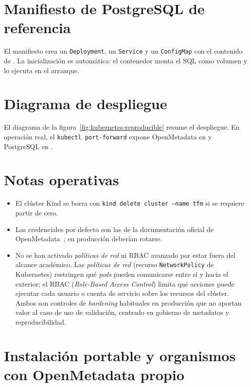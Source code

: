 \section{Manifiesto de PostgreSQL de referencia}

El manifiesto  crea un \texttt{Deployment}, un \texttt{Service} y un \texttt{ConfigMap} con el contenido de . La inicialización es automática: el contenedor monta el \ac{SQL} como volumen y lo ejecuta en el arranque.

\section{Diagrama de despliegue}

El diagrama de la figura~\ref{fig:kubernetes-reproducible} resume el despliegue. En operación real, el \texttt{kubectl port-forward} expone OpenMetadata en  y PostgreSQL en .

\section{Notas operativas}

\begin{itemize}
    \item El clúster Kind se borra con \texttt{kind delete cluster --name tfm} si se requiere partir de cero.
    \item Las credenciales por defecto son las de la documentación oficial de OpenMetadata~\cite{openmetadataDocs}; en producción deberían rotarse.
    \item No se han activado \emph{políticas de red} ni \ac{RBAC} avanzado por estar fuera del alcance académico. Las \emph{políticas de red} (recurso \texttt{NetworkPolicy} de Kubernetes) restringen qué \emph{pods} pueden comunicarse entre sí y hacia el exterior; el \ac{RBAC} (\emph{Role-Based Access Control}) limita qué acciones puede ejecutar cada usuario o cuenta de servicio sobre los recursos del clúster. Ambos son controles de \emph{hardening} habituales en producción que no aportan valor al caso de uso de validación, centrado en gobierno de metadatos y reproducibilidad.
\end{itemize}

\section{Instalación portable y organismos con OpenMetadata propio}\label{sec:instalacion-portable}


